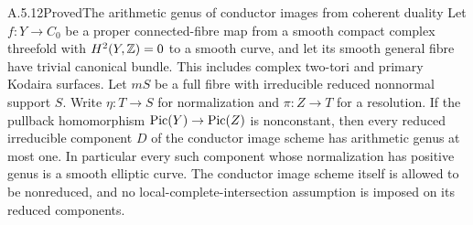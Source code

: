 
\begin{statement}{A.5.12}{Proved}{The arithmetic genus of conductor images from coherent duality}
Let $f:Y\to C_0$ be a proper connected-fibre map from a
smooth compact complex threefold with $H^2(Y,\mathbb Z)=0$ to
a smooth curve, and let its smooth general fibre have
trivial canonical bundle. This includes complex
two-tori and primary Kodaira surfaces.
Let $mS$ be a full fibre with irreducible
reduced nonnormal support $S$. Write $\eta:T\to S$ for
normalization and $\pi:Z\to T$ for a resolution.
If the pullback homomorphism
$\operatorname{Pic}(Y)\to\operatorname{Pic}(Z)$ is nonconstant, then every reduced
irreducible component $D$ of the conductor image scheme
has arithmetic genus at most one.
In particular every such component whose normalization
has positive genus is a smooth elliptic curve.
The conductor image scheme itself is allowed to be
nonreduced, and no local-complete-intersection assumption
is imposed on its reduced components.
\end{statement}
